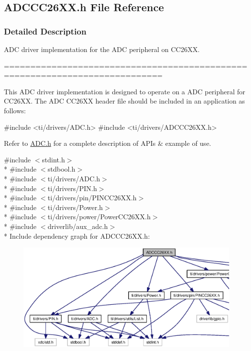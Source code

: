 \subsection{A\+D\+C\+C\+C26\+X\+X.\+h File Reference}
\label{_a_d_c_c_c26_x_x_8h}


\subsubsection{Detailed Description}
A\+D\+C driver implementation for the A\+D\+C peripheral on C\+C26\+X\+X. 

============================================================================

This A\+D\+C driver implementation is designed to operate on a A\+D\+C peripheral for C\+C26\+X\+X. The A\+D\+C C\+C26\+X\+X header file should be included in an application as follows\+: 
\begin{DoxyCode}
\textcolor{preprocessor}{#include <ti/drivers/ADC.h>}
\textcolor{preprocessor}{#include <ti/drivers/ADCCC26XX.h>}
\end{DoxyCode}


Refer to \hyperlink{_a_d_c_8h}{A\+D\+C.\+h} for a complete description of A\+P\+Is \& example of use. 

{\ttfamily \#include $<$stdint.\+h$>$}\\*
{\ttfamily \#include $<$stdbool.\+h$>$}\\*
{\ttfamily \#include $<$ti/drivers/\+A\+D\+C.\+h$>$}\\*
{\ttfamily \#include $<$ti/drivers/\+P\+I\+N.\+h$>$}\\*
{\ttfamily \#include $<$ti/drivers/pin/\+P\+I\+N\+C\+C26\+X\+X.\+h$>$}\\*
{\ttfamily \#include $<$ti/drivers/\+Power.\+h$>$}\\*
{\ttfamily \#include $<$ti/drivers/power/\+Power\+C\+C26\+X\+X.\+h$>$}\\*
{\ttfamily \#include $<$driverlib/aux\+\_\+adc.\+h$>$}\\*
Include dependency graph for A\+D\+C\+C\+C26\+X\+X.\+h\+:
\nopagebreak
\begin{figure}[H]
\begin{center}
\leavevmode
\includegraphics[width=350pt]{_a_d_c_c_c26_x_x_8h__incl}
\end{center}
\end{figure}

